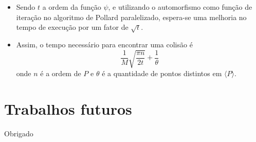 \documentclass{beamer}
\begin{document}
\begin{frame}
  \begin{itemize}
    \item Sendo $t$ a ordem da função $\psi$, e utilizando o automorfismo como função de iteração no algoritmo de Pollard paralelizado, espera-se uma melhoria no tempo de execução por um fator de $\sqrt{t}$.
    \item Assim, o tempo necessário para encontrar uma colisão é
    $$
      \frac{1}{M}\sqrt{\frac{\pi n}{2t}} + \frac{1}{\theta}
    $$
    onde $n$ é a ordem de $P$ e $\theta$ é a quantidade de pontos distintos em $\langle P \rangle$.
  \end{itemize}
\end{frame}

%
%

\section{Trabalhos futuros}
\begin{frame}
\begin{center}
  Obrigado
\end{center}
\end{frame}
\end{document}
